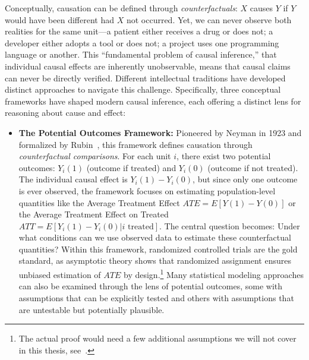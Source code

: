 Conceptually, causation can be defined through \emph{counterfactuals}: $X$ causes $Y$ if $Y$ would have been different had $X$ not occurred.
Yet, we can never observe both realities for the same unit---a patient either receives a drug or does not; a developer either adopts a tool or does not; a project uses one programming language or another.
This ``fundamental problem of causal inference,'' that individual causal effects are inherently unobservable, means that causal claims can never be directly verified.
Different intellectual traditions have developed distinct approaches to navigate this challenge.
Specifically, three conceptual frameworks have shaped modern causal inference, each offering a distinct lens for reasoning about cause and effect:
\begin{itemize}[leftmargin=15pt]
    \item \textbf{The Potential Outcomes Framework:} Pioneered by Neyman in 1923 and formalized by Rubin~\cite{rubin1974estimating}, this framework defines causation through \emph{counterfactual comparisons}. 
    For each unit $i$, there exist two potential outcomes: $Y_i(1)$ (outcome if treated) and $Y_i(0)$ (outcome if not treated). 
    The individual causal effect is $Y_i(1) - Y_i(0)$, but since only one outcome is ever observed, the framework focuses on estimating population-level quantities like the Average Treatment Effect $ATE = E[Y(1) - Y(0)]$ or the Average Treatment Effect on Treated $ATT =E[Y_i(1)-Y_i(0)|i \text{ treated}]$.
    The central question becomes: Under what conditions can we use observed data to estimate these counterfactual quantities?
    Within this framework, randomized controlled trials are the gold standard, as asymptotic theory shows that randomized assignment ensures unbiased estimation of $ATE$ by design.\footnote{The actual proof would need a few additional assumptions we will not cover in this thesis, see~\citet{cunningham2021causal}.}
    Many statistical modeling approaches can also be examined through the lens of potential outcomes, some with assumptions that can be explicitly tested and others with assumptions that are untestable but potentially plausible.
    

\end{itemize}
